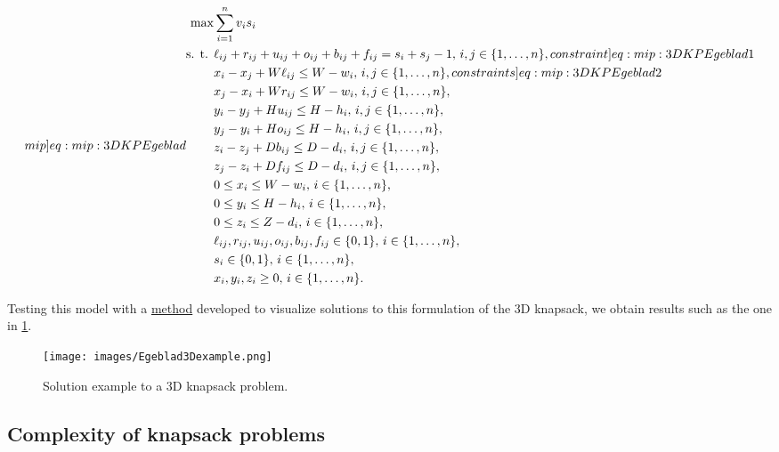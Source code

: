 \begin{subequations}
    \label[mip]{eq:mip:3DKP Egeblad}
    \begin{align}
        \max &\sum_{i=1}^{n}v_i s_i\\
        \text{s. t. } & \ell_{ij} + r_{ij} + u_{ij} + o_{ij} + b_{ij} + f_{ij} = s_i + s_j - 1, \, i, j \in \{1,\dots,n\}, \label[constraint]{eq:mip:3DKP Egeblad 1}\\
        & x_i - x_j + W\ell_{ij} \leq W - w_i, \, i, j \in \{1,\dots,n\}, \label[constraints]{eq:mip:3DKP Egeblad 2}\\
        & x_j - x_i + Wr_{ij} \leq W - w_i, \, i, j \in \{1,\dots,n\},\\
        & y_i - y_j + Hu_{ij} \leq H - h_i, \, i, j \in \{1,\dots,n\},\\
        & y_j - y_i + Ho_{ij} \leq H - h_i, \, i, j \in \{1,\dots,n\},\\
        & z_i - z_j + Db_{ij} \leq D - d_i, \, i, j \in \{1,\dots,n\},\\
        & z_j - z_i + Df_{ij} \leq D - d_i, \, i, j \in \{1,\dots,n\},\\
        & 0 \leq x_i \leq W - w_i, \, i \in \{1,\dots,n\},\\
        & 0 \leq y_i \leq H - h_i, \, i \in \{1,\dots,n\},\\
        & 0 \leq z_i \leq Z - d_i, \, i \in \{1,\dots,n\},\\
        & \ell_{ij}, r_{ij}, u_{ij}, o_{ij}, b_{ij}, f_{ij} \in \{0,1\}, \, i \in \{1,\dots,n\},\\
        & s_i \in \{0,1\}, \, i \in \{1,\dots,n\},\\
        & x_i, y_i, z_i \geq 0, \, i \in \{1,\dots,n\}.
    \end{align}
\end{subequations}

Testing this model with a \href{function draw_3d_knapsack_solution(kv::KnapsackVectors)}{method} developed to visualize solutions to this formulation of the 3D knapsack, we obtain results such as the one in \cref{fig:3DKP Egeblad solution example}.

\begin{figure}[h]
    \centering
    \texttt{[image: images/Egeblad3Dexample.png]}
    \caption{Solution example to a 3D knapsack problem.}
    \label{fig:3DKP Egeblad solution example}
\end{figure}

\subsection{Complexity of knapsack problems}

